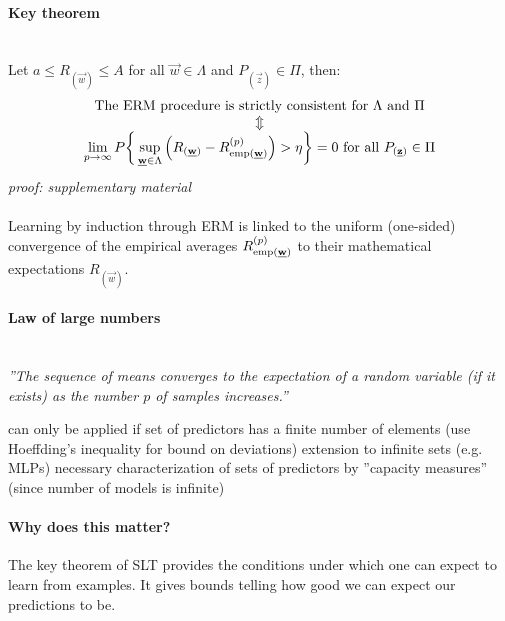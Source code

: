 \paragraph{Key theorem}\mbox{}
\\
Let $a \leq R_{(\vec{w})} \leq A$ for all $\vec{w} \in \Lambda$ and $P_{(\vec{z})} \in \Pi$, then:
\begin{equation}
	\begin{array}{c}
	\text{The ERM procedure is strictly consistent for } \Lambda 
		\text{ and } \Pi \\
	\Updownarrow \\
	\lim\limits_{p \rightarrow \infty} P \bigg\{ 
		\sup\limits_{\underline{\mathbf{w}} \in \Lambda}
		\Big( R_{(\underline{\mathbf{w}})} - R_{\operatorname{emp} (\underline{\mathbf{w}})}^{(p)} \Big)
		> \eta \bigg\} = 0 \text{ for all } P_{(\underline{\mathbf{z}})} \in \Pi
	\end{array}
\end{equation}
{\it proof: supplementary material}
\\\\
Learning by induction through ERM is linked to the uniform (one-sided) convergence of the empirical averages $R_{\operatorname{emp} (\underline{\mathbf{w}})}^{(p)}$ to their mathematical expectations $R_{(\vec{w})}$.

\paragraph{Law of large numbers}\mbox{}
\\
{\it ''The sequence of means converges to the expectation of a random variable (if it exists) as the number $p$ of samples increases.''} 
\begin{itemize}
	\itR can only be applied if set of predictors has a finite number of 
		elements (use Hoeffding's inequality for bound on 	
		deviations)
	\itR extension to infinite sets (e.g. MLPs) necessary
	\itR characterization of sets of predictors by ''capacity measures'' 
		(since number of models is infinite)
\end{itemize}

\paragraph{Why does this matter?} The key theorem of SLT provides the
conditions under which one can expect to learn from examples. It gives
bounds telling how good we can expect our predictions to be. 

